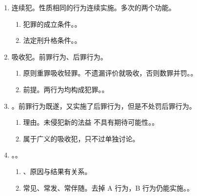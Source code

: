 \begin{enumerate}
\begin{enumerate}
\begin{kk}{常考}
                  \begin{enumerate}
                    \item 绑架 + 杀人、绑架 + 故意伤害致人重伤、死亡。
                    \item 拐卖 + 强奸、收买/拐骗 + 拐卖 = 拐卖。
                    \item 交通肇事罪 + 因逃逸致人死亡。
                    \item 组织、运送他人偷越国（边）境 + 妨害公务/非法拘禁。
                    \item 走私、贩卖、运输、制造毒品 + 妨害公务。
                  \end{enumerate}
                \end{kk}
          \item 连续犯。性质相同的行为连续实施。多次的两个功能。
                \begin{enumerate}
                  \item 犯罪的成立条件。。
                  \item 法定刑升格条件。。
                \end{enumerate}
          \item 吸收犯。前罪行为、后罪行为。
                \begin{enumerate}
                  \item 原则重罪吸收轻罪。不遗漏评价就吸收，否则数罪并罚。。
                  \item 前提。两行为均构成犯罪。。
                \end{enumerate}
          \item {}。前罪行为既遂，又实施了后罪行为，但是不处罚后罪行为。
                \begin{enumerate}
                  \item 理由。未侵犯新的法益 \hz 不具有期待可能性。。
                  \item 属于广义的吸收犯，只不过单独讨论。
                \end{enumerate}
          \item {}。。
                \begin{enumerate}
                  \item {}、原因与结果有关系。
                  \item 常见、常发、常伴随。去掉 A 行为，B 行为仍能实施。。

\end{enumerate}
\end{enumerate}
\end{enumerate}
